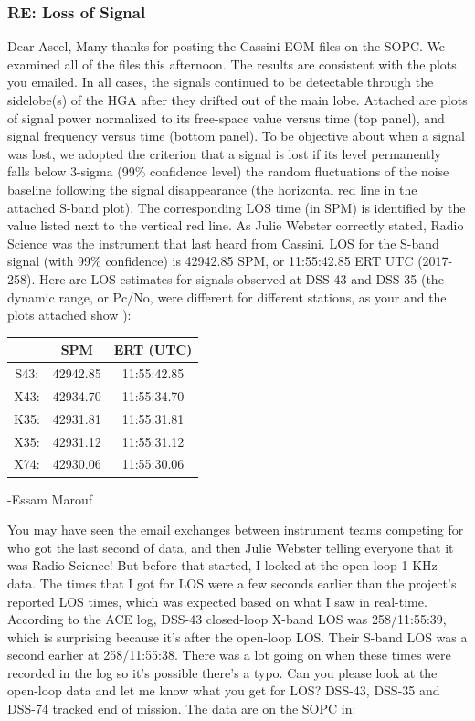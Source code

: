 \documentclass[crop=false,class=book]{standalone}
\begin{document}
\subsubsection{RE: Loss of Signal}
Dear Aseel, Many thanks for posting the Cassini EOM files on the SOPC.  We examined all of the files this afternoon. The results are consistent with the plots you emailed. In all cases, the signals continued to be detectable through the sidelobe(s) of the HGA after they  drifted out of the main lobe.  Attached are plots of signal power normalized to its free-space value versus time (top panel), and signal frequency versus time (bottom panel). To be objective about when a signal was lost, we adopted the criterion that a signal is lost if its level permanently falls below 3-sigma (99\% confidence level) the random fluctuations of the noise baseline following the signal disappearance (the horizontal red line in the attached S-band plot).  The corresponding LOS time (in SPM) is identified by the value listed next to the vertical red line. As Julie Webster correctly stated, Radio Science was the instrument that last heard from Cassini. LOS for the S-band signal (with 99\% confidence) is 42942.85 SPM, or 11:55:42.85 ERT UTC (2017-258). Here are LOS estimates for signals observed at DSS-43 and DSS-35 (the dynamic range, or Pc/No, were different for different stations, as your and the plots attached show ):
\begin{table}[H]
    \centering
    \begin{tabular}{c c c} 
    \hline
     & SPM      & ERT (UTC)    \\ 
    \hline
    S43: & 42942.85 & 11:55:42.85  \\
    X43: & 42934.70 & 11:55:34.70  \\
    K35: & 42931.81 & 11:55:31.81  \\
    X35: & 42931.12 & 11:55:31.12  \\
    X74: & 42930.06 & 11:55:30.06  \\
    \hline
\end{tabular}
\end{table}
-Essam Marouf\par
You may have seen the email exchanges between instrument teams competing for who got the last second of data, and then Julie Webster telling everyone that it was Radio Science! But before that started, I looked at the open-loop 1 KHz data. The times that I got for LOS were a few seconds earlier than the project's reported LOS times, which was expected based on what I saw in real-time. According to the ACE log, DSS-43 closed-loop X-band LOS was 258/11:55:39, which is surprising because it's after the open-loop LOS.  Their S-band LOS was a second earlier at 258/11:55:38.  There was a lot going on when these times were recorded in the log so it's possible there's a typo. Can you please look at the open-loop data and let me know what you get for LOS? DSS-43, DSS-35 and DSS-74 tracked end of mission. The data are on the SOPC in:
\end{document}

